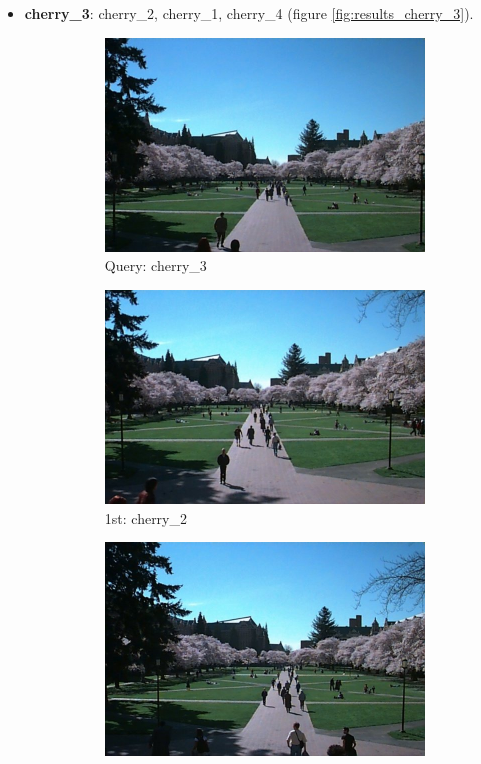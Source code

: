 \documentclass[10pt, a4paper]{article}
\begin{document}
\begin{itemize}
\item \textbf{cherry\_3}: cherry\_2, cherry\_1, cherry\_4 (figure \ref{fig:results_cherry_3}).
\begin{figure}[H]
	\centering
	\begin{subfigure}{0.25\textwidth}
	  \centering
	  \includegraphics[width=0.9\linewidth]{../input/cherry_3.jpg}
	  \caption{Query: cherry\_3}
	\end{subfigure}%
	\begin{subfigure}{0.25\textwidth}
	  \centering
	  \includegraphics[width=0.9\linewidth]{../input/cherry_2.jpg}
	  \caption{1st: cherry\_2}
	\end{subfigure}%
	\begin{subfigure}{0.25\textwidth}
        \centering
        \includegraphics[width=0.9\linewidth]{../input/cherry_1.jpg}

\end{subfigure}
\end{figure}
\end{itemize}
\end{document}
